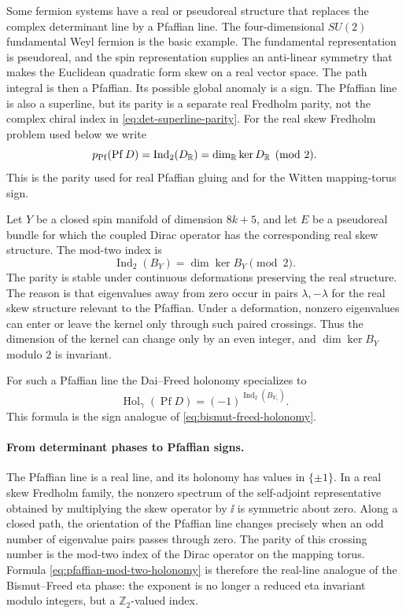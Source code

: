 Some fermion systems have a real or pseudoreal structure that replaces the
complex determinant line by a Pfaffian line.  The four-dimensional
\(SU(2)\) fundamental Weyl fermion is the basic example.  The fundamental
representation is pseudoreal, and the spin representation supplies an
anti-linear symmetry that makes the Euclidean quadratic form skew on a real
vector space.  The path integral is then a Pfaffian.  Its possible global
anomaly is a sign.
The Pfaffian line is also a superline, but its parity is a separate real
Fredholm parity, not the complex chiral index in
\eqref{eq:det-superline-parity}.  For the real skew Fredholm problem used
below we write
\[
  p_{\rm Pf}(\operatorname{Pf}D)
  =
  \operatorname{Ind}_2(D_{\mathbb R})
  =
  \dim_{\mathbb R}\ker D_{\mathbb R}
  \pmod 2 .
\]
This is the parity used for real Pfaffian gluing and for the Witten
mapping-torus sign.

\begin{definition}
\label{def:mod-two-index}
Let \(Y\) be a closed spin manifold of dimension \(8k+5\), and let \(E\) be a
pseudoreal bundle for which the coupled Dirac operator has the corresponding
real skew structure.  The mod-two index is
\begin{equation}
  \operatorname{Ind}_2(B_Y)
  =
  \dim\ker B_Y
  \pmod 2 .
  \label{eq:mod-two-index-definition}
\end{equation}
The parity is stable under continuous deformations preserving the real
structure.  The reason is that eigenvalues away from zero occur in pairs
\(\lambda,-\lambda\) for the real
skew structure relevant to the Pfaffian.  Under a deformation, nonzero
eigenvalues can enter or leave the kernel only through such paired crossings.
Thus the dimension of the kernel can change only by an even integer, and
\(\dim\ker B_Y\) modulo \(2\) is invariant.
\end{definition}

For such a Pfaffian line the Dai--Freed holonomy specializes to
\begin{equation}
  \operatorname{Hol}_\gamma(\operatorname{Pf}D)
  =
  (-1)^{\operatorname{Ind}_2(B_{Y_\gamma})}.
  \label{eq:pfaffian-mod-two-holonomy}
\end{equation}
This formula is the sign analogue of
\eqref{eq:bismut-freed-holonomy}.

\paragraph{From determinant phases to Pfaffian signs.}
The Pfaffian line is a real line, and its holonomy has values in
\(\{\pm1\}\).  In a real skew Fredholm family, the nonzero spectrum of the
self-adjoint representative obtained by multiplying the skew operator by
\(\ii\) is symmetric about zero.  Along a closed path, the orientation of the
Pfaffian line changes precisely when an odd number of eigenvalue pairs passes
through zero.  The parity of this crossing number is the mod-two index of the
Dirac operator on the mapping torus.  Formula
\eqref{eq:pfaffian-mod-two-holonomy} is therefore the real-line analogue of
the Bismut--Freed eta phase: the exponent is no longer a reduced eta invariant
modulo integers, but a \(\mathbb Z_2\)-valued index.

